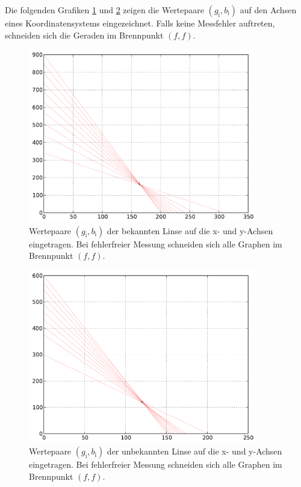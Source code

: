 		Die folgenden Grafiken \ref{fig:graph_bekannt} und \ref{fig:graph_unbekannt} zeigen die Wertepaare $(g_\mathrm{i}, b_\mathrm{i})$ auf den Achsen eines Koordinatensystems eingezeichnet.
		Falls keine Messfehler auftreten, schneiden sich die Geraden im Brennpunkt $(f, f)$.

		\begin{figure}[h!]
			\centering
			\includegraphics[width = 10cm]{img/graph_bekannt.pdf}
			\caption{Wertepaare $(g_\mathrm{i}, b_\mathrm{i})$ der bekannten Linse auf die x- und y-Achsen eingetragen. Bei fehlerfreier Messung schneiden sich alle Graphen im Brennpunkt $(f, f)$.}
			\label{fig:graph_bekannt}
		\end{figure}

		\begin{figure}[h!]
			\centering
			\includegraphics[width = 10cm]{img/graph_unbekannt.pdf}
			\caption{Wertepaare $(g_\mathrm{i}, b_\mathrm{i})$ der unbekannten Linse auf die x- und y-Achsen eingetragen. Bei fehlerfreier Messung schneiden sich alle Graphen im Brennpunkt $(f, f)$.}
			\label{fig:graph_unbekannt}
		\end{figure}


